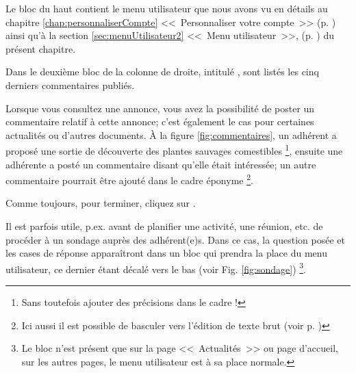 Le bloc du haut contient le menu utilisateur que nous avons vu en détails au chapitre \ref{chap:personnaliserCompte} <<~Personnaliser votre compte~>> (p. \pageref{chap:personnaliserCompte}) ainsi qu'à la section \ref{sec:menuUtilisateur2} <<~Menu utilisateur~>>, (p. \pageref{sec:menuUtilisateur2}) du présent chapitre.


Dans le deuxième bloc de la colonne de droite, intitulé , sont listés les cinq derniers commentaires publiés.

Lorsque vous consultez une annonce, vous avez la possibilité de poster un commentaire relatif à cette annonce; c’est également le cas pour certaines actualités ou d’autres documents. À la figure \ref{fig:commentaires}, un adhérent a proposé une sortie de découverte des plantes sauvages comestibles%
\footnote{Sans toutefois ajouter des précisions dans le cadre !},
ensuite une adhérente a posté un commentaire disant qu'elle était intéressée; un autre commentaire pourrait être ajouté dans le cadre éponyme %
\footnote{Ici aussi il est possible de basculer vers l'édition de texte brut (voir p. \pageref{page:editeurTexteBrut})}.

Comme toujours, pour terminer, cliquez  sur .



 
 Il est parfois utile, p.ex. avant de planifier une activité, une réunion, etc. de procéder à un sondage auprès des adhérent(e)s. Dans ce cas, la question posée et les cases de réponse apparaîtront dans un bloc qui prendra la place du menu utilisateur, ce dernier étant décalé vers le bas (voir Fig. \ref{fig:sondage})%
 \footnote{Le bloc  n'est présent que sur la page <<~Actualités~>> ou page d'accueil, sur les autres pages, le menu utilisateur est à sa place normale.}.

